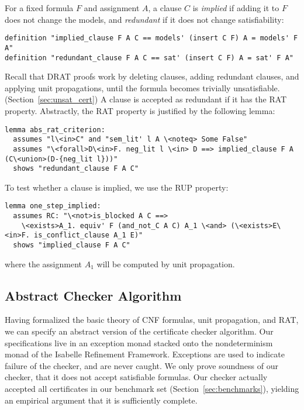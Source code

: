 \documentclass[smallcondensed]{svjour3}     %
\makeatletter
\newcommand{\isai}{\lstinline[language=isabelle,basicstyle=\normalsize\ttfamily\slshape]}
\renewcommand\lstinline[1][]{%
  \leavevmode
  \ifmmode\expandafter\hbox\fi\bgroup
    \def\lst@boxpos{b}%
    \lsthk@PreSet\lstset{flexiblecolumns,#1}%
    \lsthk@TextStyle
    \@ifnextchar\bgroup{\afterassignment\lst@InlineG \let\@let@token}%
                       \lstinline@}
\makeatother
\begin{document}
For a fixed formula $F$ and assignment $A$, a clause $C$ is \emph{implied} if adding it to $F$ does not change the models, 
and \emph{redundant} if it does not change satisfiability:
\begin{lstlisting}
definition "implied_clause F A C == models' (insert C F) A = models' F A"  
definition "redundant_clause F A C == sat' (insert C F) A = sat' F A"
\end{lstlisting}

Recall that DRAT proofs work by deleting clauses, adding redundant clauses, and applying unit propagations, 
until the formula becomes trivially unsatisfiable.(\cf Section~\ref{sec:unsat_cert})
A clause is accepted as redundant if it has the RAT property.
Abstractly, the RAT property is justified by the following lemma:
\begin{lstlisting}
lemma abs_rat_criterion:
  assumes "l\<in>C" and "sem_lit' l A \<noteq> Some False"
  assumes "\<forall>D\<in>F. neg_lit l \<in> D ==> implied_clause F A (C\<union>(D-{neg_lit l}))"  
  shows "redundant_clause F A C"
\end{lstlisting}
To test whether a clause is implied, we use the RUP property:
\begin{lstlisting}
lemma one_step_implied:
  assumes RC: "\<not>is_blocked A C ==> 
    \<exists>A_1. equiv' F (and_not_C A C) A_1 \<and> (\<exists>E\<in>F. is_conflict_clause A_1 E)"
  shows "implied_clause F A C"
\end{lstlisting}
where the assignment \isai$A_1$ will be computed by unit propagation.





% 
% 
% 

\subsection{Abstract Checker Algorithm}
Having formalized the basic theory of CNF formulas, unit propagation, and RAT, we can specify an abstract version of the certificate checker algorithm.
Our specifications live in an exception monad stacked onto the nondeterminism monad of the Isabelle Refinement Framework.
Exceptions are used to indicate failure of the checker, and are never caught.
%
We only prove soundness of our checker, \ie that it does not accept satisfiable formulas.
Our checker actually accepted all certificates in our benchmark set (\cf Section~\ref{sec:benchmarks}), yielding 
an empirical argument that it is sufficiently complete.
\end{document}
